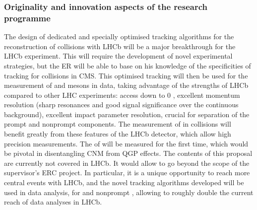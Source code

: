 \documentclass[a4paper,11pt]{article}
\newcommand{\ER}{ER\xspace}
\newcommand{\supervisor}{the supervisor\xspace}
\begin{document}
\subsubsection{Originality and innovation aspects of the research programme}

The design of dedicated and specially optimised tracking algorithms for the reconstruction of \pbpb collisions with LHCb will be a major breakthrough for the LHCb experiment. This will require the development of novel experimental strategies, but the \ER will be able to base on his knowledge of the specificities of tracking for \pbpb collisions in CMS.
%
This optimised tracking will then be used for the measurement of \Dz and \Jpsi mesons in \pbpb data, taking advantage of the strengths of LHCb compared to other LHC experiments: access down to 0 \pt, excellent momentum resolution (sharp resonances and good signal significance over the continuous background), excellent impact parameter resolution, crucial for separation of the prompt and nonprompt components.
%
The measurement of \PgUabc in \ppb collisions will benefit greatly from these features of the LHCb detector, which allow high precision measurements. The \rpa of \PgUc will be measured for the first time, which would be pivotal in disentangling CNM from QGP effects.
%
The contents of this proposal are currently not covered in LHCb. It would allow to go beyond the scope of \supervisor's ERC project. In particular, it is a unique opportunity to reach more central \pbpb events with LHCb, and the novel tracking algorithms developed will be used in data analysis, for \Dz and nonprompt \Jpsi, allowing to roughly double the current \npart reach of data analyses in LHCb. 
% 
% 

% 
\end{document}

